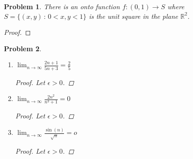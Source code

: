 \documentclass[12pt]{article}
\newtheorem{problem}{Problem}
\newcommand{\RR}{\ensuremath{\mathbb R}}
\newcommand{\eps}{\ensuremath{\epsilon}}
\begin{document}
\begin{problem} %
There is an onto function $f:(0,1) \to S$ where $S=\{(x,y)\,:\,0<x,y<1\}$ is the unit square in the plane $\RR^2$.
\end{problem}


\begin{proof}
\end{proof}



\begin{problem} %
\begin{enumerate}
\item $\displaystyle \lim_{n\to\infty} \frac{2n+1}{5n+3} = \frac{2}{5}$

\begin{proof}
Let $\eps>0$.  %
\end{proof}

\item $\displaystyle \lim_{n\to\infty} \frac{2n^2}{n^3 + 1} = 0$

\begin{proof}
Let $\eps>0$.  %
\end{proof}

\item $\displaystyle \lim_{n\to\infty} \frac{\sin(n)}{\sqrt{n}} = o$

\begin{proof}
Let $\eps>0$.  %
\end{proof}
\end{enumerate}
\end{problem}
\end{document}
